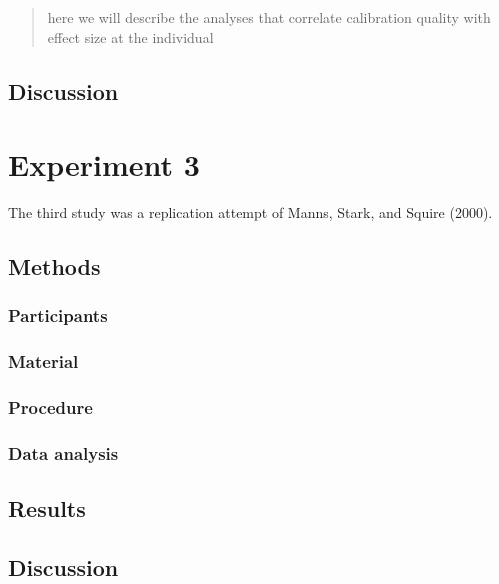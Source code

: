 \documentclass[
  english,
  man]{apa6}
\begin{document}
\begin{quote}
here we will describe the analyses that correlate calibration quality with effect size at the individual
\end{quote}

\hypertarget{discussion-1}{%
\subsection{Discussion}\label{discussion-1}}

\hypertarget{experiment-3}{%
\section{Experiment 3}\label{experiment-3}}

The third study was a replication attempt of Manns, Stark, and Squire (2000).

\hypertarget{methods-2}{%
\subsection{Methods}\label{methods-2}}

\hypertarget{participants-2}{%
\subsubsection{Participants}\label{participants-2}}

\hypertarget{material-1}{%
\subsubsection{Material}\label{material-1}}

\hypertarget{procedure-2}{%
\subsubsection{Procedure}\label{procedure-2}}

\hypertarget{data-analysis-1}{%
\subsubsection{Data analysis}\label{data-analysis-1}}

\hypertarget{results-2}{%
\subsection{Results}\label{results-2}}

\hypertarget{discussion-2}{%
\subsection{Discussion}\label{discussion-2}}
\end{document}
